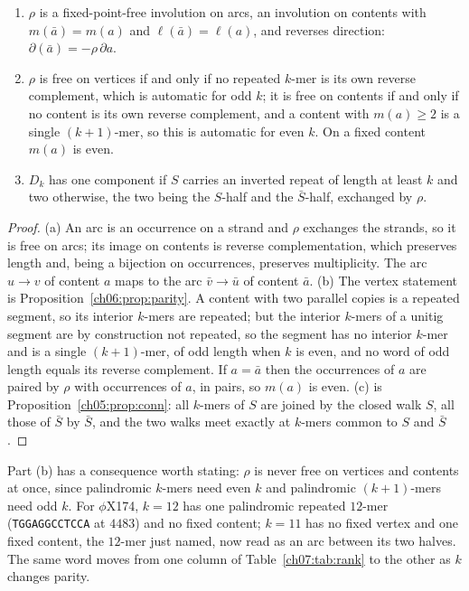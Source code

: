 \begin{lemma}\label{ch07:lem:rho}
\begin{enumerate}
\item[\rm(a)] $\rho$ is a fixed-point-free involution on arcs, an involution on contents with
$m(\bar a)=m(a)$ and $\ell(\bar a)=\ell(a)$, and reverses direction:
$\partial(\bar a)=-\rho\,\partial a$.
\item[\rm(b)] $\rho$ is free on vertices if and only if no repeated $k$-mer is its own
reverse complement, which is automatic for odd $k$; it is free on contents if and only if no
content is its own reverse complement, and a content with $m(a)\ge2$ is a single
$(k{+}1)$-mer, so this is automatic for even $k$. On a fixed content $m(a)$ is even.
\item[\rm(c)] $D_k$ has one component if $S$ carries an inverted repeat of length at least
$k$ and two otherwise, the two being the $S$-half and the $\bar S$-half, exchanged by $\rho$.
\end{enumerate}
\end{lemma}

\begin{proof}
(a) An arc is an occurrence on a strand and $\rho$ exchanges the strands, so it is free on
arcs; its image on contents is reverse complementation, which preserves length and, being a
bijection on occurrences, preserves multiplicity. The arc $u\to v$ of content $a$ maps to the
arc $\bar v\to\bar u$ of content $\bar a$.
(b) The vertex statement is Proposition~\ref{ch06:prop:parity}. A content with two parallel copies is a
repeated segment, so its interior $k$-mers are repeated; but the interior $k$-mers of a
unitig segment are by construction not repeated, so the segment has no interior $k$-mer and
is a single $(k{+}1)$-mer, of odd length when $k$ is even, and no word of odd length equals
its reverse complement. If $a=\bar a$ then the occurrences of $a$ are paired by $\rho$ with
occurrences of $a$, in pairs, so $m(a)$ is even.
(c) is Proposition~\ref{ch05:prop:conn}: all $k$-mers of $S$ are joined by the closed walk $S$, all those of
$\bar S$ by $\bar S$, and the two walks meet exactly at $k$-mers common to $S$ and $\bar S$.
\end{proof}

Part (b) has a consequence worth stating: $\rho$ is never free on vertices and contents at
once, since palindromic $k$-mers need even $k$ and palindromic $(k{+}1)$-mers need odd $k$.
For $\phi$X174, $k=12$ has one palindromic repeated $12$-mer (\texttt{TGGAGGCCTCCA} at
$4483$) and no fixed content; $k=11$ has no fixed vertex and one fixed content, the $12$-mer
just named, now read as an arc between its two halves. The same word moves from one column
of Table~\ref{ch07:tab:rank} to the other as $k$ changes parity.

